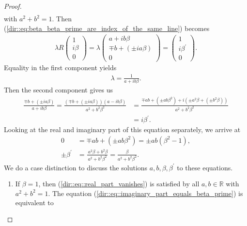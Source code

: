 \documentclass{amsart}
\newcommand{\R}{\mathbb{R}}
\begin{document}
\begin{proof}
\begin{align*}
    \end{align*}
    with $a^2 + b^2 = 1$. Then (\ref{dir::eq:beta_beta_prime_are_index_of_the_same_line}) becomes
    \begin{align*}
        \lambda R \begin{pmatrix}
            1 \\ i \beta \\ 0
        \end{pmatrix}
        = \lambda \begin{pmatrix}
            a + i b \beta \\ \mp b + (\pm i a \beta) \\ 0
        \end{pmatrix}
        = \begin{pmatrix}
            1 \\ i \beta^\prime \\ 0
        \end{pmatrix}.
    \end{align*}
    Equality in the first component yields 
    \begin{align*}
        \lambda = \frac{1}{a + i b \beta}.
    \end{align*}
    Then the second component gives us
    \begin{align*}
        \frac{\mp b + (\pm i a \beta)}{a + i b \beta}
        = \frac{(\mp b + (\pm i a \beta))(a - i b \beta)}{a^2 + b^2 \beta^2}
        &= \frac{\mp ab  + (\pm ab \beta^2) + i (\pm a^2 \beta + (\pm b^2 \beta))}{a^2 + b^2 \beta^2} \\
        &= i \beta^\prime.
    \end{align*}
    Looking at the real and imaginary part of this equation separately, we arrive at
    \begin{align}
        \label{dir::eq::real_part_vanishes} 
        0 &= \mp ab  + (\pm ab \beta^2) = \pm ab (\beta^2 - 1), \\
        \label{dir::eq::imaginary_part_equals_beta_prime}
        \pm \beta^\prime &= \frac{\ a^2 \beta +  b^2 \beta}{a^2 + b^2 \beta^2} = \frac{\beta}{a^2 + b^2 \beta^2} .
    \end{align}
    We do a case distinction to discuss the solutions $a, b, \beta, \beta^\prime$ to these equations.
    \begin{enumerate}
        \item If $\beta = 1$, then (\ref{dir::eq::real_part_vanishes}) is satisfied by all $a, b \in \R$ with $a^2 + b^2 = 1$. The equation (\ref{dir::eq::imaginary_part_equals_beta_prime}) is equivalent to

\end{enumerate}
\end{proof}
\end{document}
